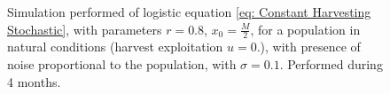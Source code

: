 \begin{figure}[H]
	\caption{Simulation performed of logistic equation \ref{eq: Constant Harvesting Stochastic}, with parameters $r=0.8$, $x_0=\frac{M}{2}$, for a population in natural conditions (harvest exploitation $u=0$.), with presence of noise proportional to the population, with $\sigma=0.1$. Performed during 4 months.  }
\end{figure}


